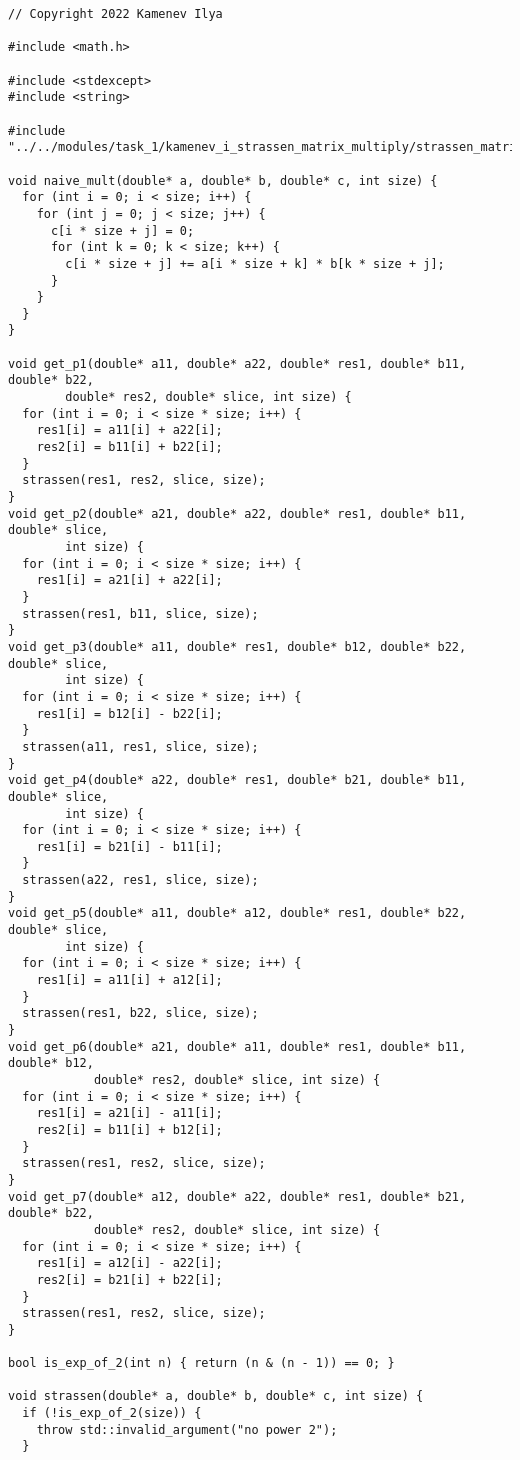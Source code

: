 \documentclass{report}
\begin{document}
\begin{lstlisting}
// Copyright 2022 Kamenev Ilya

#include <math.h>

#include <stdexcept>
#include <string>

#include "../../modules/task_1/kamenev_i_strassen_matrix_multiply/strassen_matrix_multiply.h"

void naive_mult(double* a, double* b, double* c, int size) {
  for (int i = 0; i < size; i++) {
    for (int j = 0; j < size; j++) {
      c[i * size + j] = 0;
      for (int k = 0; k < size; k++) {
        c[i * size + j] += a[i * size + k] * b[k * size + j];
      }
    }
  }
}

void get_p1(double* a11, double* a22, double* res1, double* b11, double* b22,
        double* res2, double* slice, int size) {
  for (int i = 0; i < size * size; i++) {
    res1[i] = a11[i] + a22[i];
    res2[i] = b11[i] + b22[i];
  }
  strassen(res1, res2, slice, size);
}
void get_p2(double* a21, double* a22, double* res1, double* b11, double* slice,
        int size) {
  for (int i = 0; i < size * size; i++) {
    res1[i] = a21[i] + a22[i];
  }
  strassen(res1, b11, slice, size);
}
void get_p3(double* a11, double* res1, double* b12, double* b22, double* slice,
        int size) {
  for (int i = 0; i < size * size; i++) {
    res1[i] = b12[i] - b22[i];
  }
  strassen(a11, res1, slice, size);
}
void get_p4(double* a22, double* res1, double* b21, double* b11, double* slice,
        int size) {
  for (int i = 0; i < size * size; i++) {
    res1[i] = b21[i] - b11[i];
  }
  strassen(a22, res1, slice, size);
}
void get_p5(double* a11, double* a12, double* res1, double* b22, double* slice,
        int size) {
  for (int i = 0; i < size * size; i++) {
    res1[i] = a11[i] + a12[i];
  }
  strassen(res1, b22, slice, size);
}
void get_p6(double* a21, double* a11, double* res1, double* b11, double* b12,
            double* res2, double* slice, int size) {
  for (int i = 0; i < size * size; i++) {
    res1[i] = a21[i] - a11[i];
    res2[i] = b11[i] + b12[i];
  }
  strassen(res1, res2, slice, size);
}
void get_p7(double* a12, double* a22, double* res1, double* b21, double* b22,
            double* res2, double* slice, int size) {
  for (int i = 0; i < size * size; i++) {
    res1[i] = a12[i] - a22[i];
    res2[i] = b21[i] + b22[i];
  }
  strassen(res1, res2, slice, size);
}

bool is_exp_of_2(int n) { return (n & (n - 1)) == 0; }

void strassen(double* a, double* b, double* c, int size) {
  if (!is_exp_of_2(size)) {
    throw std::invalid_argument("no power 2");
  }


\end{lstlisting}
\end{document}
